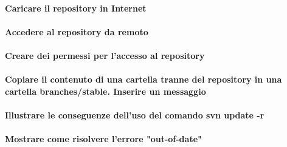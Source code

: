 \documentclass[a4paper]{article}
\begin{document}
	\paragraph{Caricare il repository in Internet}
	
	\paragraph{Accedere al repository da remoto}
	
	\paragraph{Creare dei permessi per l'accesso al repository}
	
	\paragraph{Copiare il contenuto di una cartella tranne del repository in una cartella branches/stable. Inserire un messaggio}
	
	\paragraph{Illustrare le conseguenze dell'uso del comando svn update -r}
	
	\paragraph{Mostrare come risolvere l'errore "out-of-date"}	
	
\end{document}
